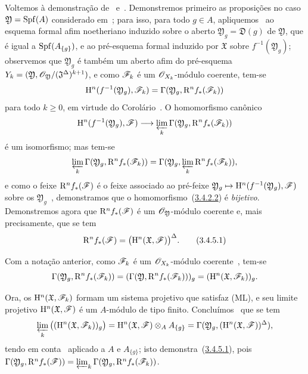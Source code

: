 \begin{env}[3.4.5]
\label{III.3.4.5}
Voltemos à demonstração de~ e~.
Demonstremos primeiro as proposições no caso $\mathfrak{Y}=\operatorname{Spf}(A)$ considerado em~; para isso, para todo $g\in A$, apliquemos~ ao esquema formal afim noetheriano induzido sobre o aberto $\mathfrak{Y}_g=\mathfrak{D}(g)$ de $\mathfrak{Y}$, que é igual a $\operatorname{Spf}(A_{\{g\}})$, e ao pré-esquema formal induzido por $\mathfrak{X}$ sobre $f^{-1}(\mathfrak{Y}_g)$; observemos que $\mathfrak{Y}_g$ é também um aberto afim do pré-esquema $Y_k=(\mathfrak{Y},\mathscr{O}_\mathfrak{Y}/(\mathfrak{J}^\Delta)^{k+1})$, e como $\mathscr{F}_k$ é um $\mathscr{O}_{X_k}$-módulo coerente, tem-se
\[
  \mathrm{H}^n(f^{-1}(\mathfrak{Y}_g),\mathscr{F}_k)=\Gamma(\mathfrak{Y}_g,\mathrm{R}^n f_*(\mathscr{F}_k))
\]
para todo $k\geq 0$, em virtude do Corolário~.
O homomorfismo canônico
\[
  \HH^n(f^{-1}(\mathfrak{Y}_g),\sh{F})\to\varprojlim_k\Gamma(\mathfrak{Y}_g,\RR^n f_*(\sh{F}_k))
\]
é um isomorfismo; mas tem-se~
\[
  \varprojlim_k\Gamma(\mathfrak{Y}_g,\mathrm{R}^n f_*(\mathscr{F}_k))=\Gamma(\mathfrak{Y}_g,\varprojlim_k\mathrm{R}^n f_*(\mathscr{F}_k)),
\]
e como o feixe $\mathrm{R}^n f_*(\mathscr{F})$ é o feixe associado ao pré-feixe $\mathfrak{Y}_g\mapsto\HH^n(f^{-1}(\mathfrak{Y}_g),\sh{F})$ sobre os $\mathfrak{Y}_g$~, demonstramos que o homomorfismo~(\hyperref[III.3.4.2.2]{3.4.2.2}) é \emph{bijetivo}.
Demonstremos agora que $\mathrm{R}^n f_*(\mathscr{F})$ é um $\mathscr{O}_\mathfrak{Y}$-módulo coerente e, mais precisamente, que se tem
\[
\label{III.3.4.5.1}
  \RR^n f_*(\sh{F})=\big(\HH^n(\mathfrak{X},\sh{F})\big)^\Delta.
  \tag{3.4.5.1}
\]

Com a notação anterior, como $\mathscr{F}_k$ é um $\mathscr{O}_{X_k}$-módulo coerente~, tem-se
\[
  \Gamma(\mathfrak{Y}_g,\mathrm{R}^n f_*(\mathscr{F}_k))=(\Gamma(\mathfrak{Y},\mathrm{R}^n f_*(\mathscr{F}_k)))_g=(\mathrm{H}^n(\mathfrak{X},\mathscr{F}_k))_g.
\]

Ora, os $\mathrm{H}^n(\mathfrak{X},\mathscr{F}_k)$ formam um sistema projetivo que satisfaz (ML), e seu limite projetivo $\mathrm{H}^n(\mathfrak{X},\mathscr{F})$ é um $A$-módulo de tipo finito.
Concluímos~ que se tem
\[
  \varprojlim_k\big((\mathrm{H}^n(\mathfrak{X},\mathscr{F}_k))_g\big)=\mathrm{H}^n(\mathfrak{X},\mathscr{F})\otimes_A A_{\{g\}}=\Gamma(\mathfrak{Y}_g,(\mathrm{H}^n(\mathfrak{X},\mathscr{F}))^\Delta),
\]
tendo em conta~ aplicado a $A$ e $A_{\{g\}}$; isto demonstra~(\hyperref[III.3.4.5.1]{3.4.5.1}), pois $\Gamma(\mathfrak{Y}_g,\mathrm{R}^n f_*(\mathscr{F}))=\varprojlim_k\Gamma(\mathfrak{Y}_g,\mathrm{R}^n f_*(\mathscr{F}_k))$.


\end{env}
